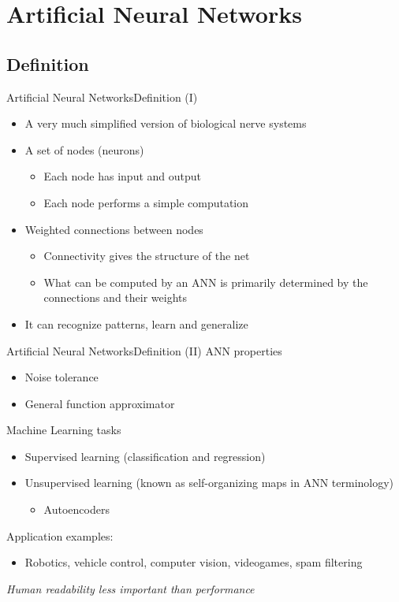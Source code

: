 \documentclass[10pt,compress]{beamer} %
\begin{document}
\section{Artificial Neural Networks}
\subsection{Definition}

\begin{frame}{Artificial Neural Networks}{Definition (I)}
	\begin{itemize}
	\item A very much simplified version of biological nerve systems
	\item A set of nodes (neurons) 
		\begin{itemize}
		\item Each node has input and output
		\item Each node performs a simple computation 
		\end{itemize}
	\item Weighted connections between nodes
		\begin{itemize}
		\item Connectivity gives the structure of the net
		\item What can be computed by an ANN is primarily determined by the connections and their weights
		\end{itemize}
	\item It can \alert{recognize patterns}, \alert{learn} and \alert{generalize}
	\end{itemize}
\end{frame}

\begin{frame}{Artificial Neural Networks}{Definition (II)}
ANN properties
	\begin{itemize}
	\item Noise tolerance
	\item General function approximator
	\end{itemize}
Machine Learning tasks
	\begin{itemize}
	\item Supervised learning (classification and regression)
	\item Unsupervised learning (known as \alert{self-organizing maps} in ANN terminology)
		\begin{itemize}
		\item Autoencoders
		\end{itemize}
	\end{itemize}
Application examples: 
	\begin{itemize}
		\item Robotics, vehicle control, computer vision, videogames, spam filtering
	\end{itemize}
\centering \textit{Human readability less important than performance}
\end{frame}
\end{document}
